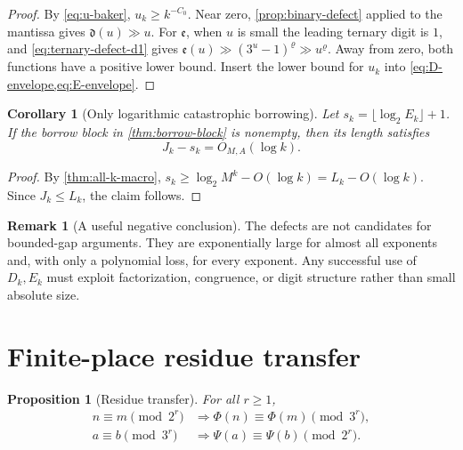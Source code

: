 \documentclass[11pt]{article}
\newtheorem{proposition}[theorem]{Proposition}
\newtheorem{corollary}[theorem]{Corollary}
\theoremstyle{definition}
\newtheorem{remark}[theorem]{Remark}
\begin{document}
\begin{proof}
By \cref{eq:u-baker}, \(u_k\ge k^{-C_0}\).  Near zero,
\cref{prop:binary-defect} applied to the mantissa gives
\(\mathfrak d(u)\gg u\).  For \(\mathfrak e\), when \(u\) is small the
leading ternary digit is \(1\), and \cref{eq:ternary-defect-d1} gives
\(\mathfrak e(u)\gg(3^u-1)^\varrho\gg u^\varrho\).  Away from zero, both
functions have a positive lower bound.  Insert the lower bound for \(u_k\)
into \cref{eq:D-envelope,eq:E-envelope}.
\end{proof}

\begin{corollary}[Only logarithmic catastrophic borrowing]\label{cor:borrow-log}
Let \(s_k=\lfloor\log_2E_k\rfloor+1\).  If the borrow block in
\cref{thm:borrow-block} is nonempty, then its length satisfies
\begin{equation}\label{eq:borrow-log}
 J_k-s_k=O_{M,A}(\log k).
\end{equation}
\end{corollary}

\begin{proof}
By \cref{thm:all-k-macro},
\(s_k\ge\log_2M^k-O(\log k)=L_k-O(\log k)\).  Since \(J_k\le L_k\), the
claim follows.
\end{proof}

\begin{remark}[A useful negative conclusion]
The defects are not candidates for bounded-gap arguments.  They are
exponentially large for almost all exponents and, with only a polynomial
loss, for every exponent.  Any successful use of \(D_k,E_k\) must exploit
factorization, congruence, or digit structure rather than small absolute
size.
\end{remark}

\section{Finite-place residue transfer}
\label{sec:residues}

\begin{proposition}[Residue transfer]\label{prop:residue-transfer}
For all \(r\ge1\),
\begin{align}
 n\equiv m\pmod{2^r}
 &\Longrightarrow
 \Phi(n)\equiv\Phi(m)\pmod{3^r},
 \label{eq:Phi-residue}\\
 a\equiv b\pmod{3^r}
 &\Longrightarrow
 \Psi(a)\equiv\Psi(b)\pmod{2^r}.
 \label{eq:Psi-residue}
\end{align}
\end{proposition}
\end{document}
